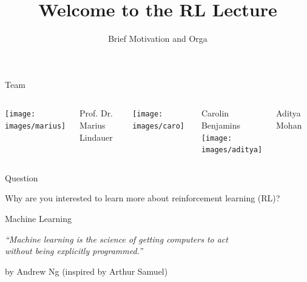 \documentclass[aspectratio=169, handout]{../latex_main/tntbeamer}  %
\title[ML-RL: Big Picture]{Welcome to the RL Lecture}
\subtitle{Brief Motivation and Orga}
\begin{document}
	
	\maketitle

\begin{frame}[c]{Team}
	
	\begin{columns}[T]
		
		\centering
		\texttt{[image: images/marius]}
		
		Prof. Dr.\\ Marius Lindauer
		
		\centering
		\texttt{[image: images/caro]}
		
		Carolin Benjamins\\
		
		\centering
		\texttt{[image: images/aditya]}
		
		Aditya Mohan \\
		
		
		
		
	\end{columns}
	
	
\end{frame}
\begin{frame}[c]{Question}
	
	\centering
	{
	\huge
	Why are you interested to learn more about reinforcement learning (RL)?
	}

	
\end{frame}
\begin{frame}[c]{Machine Learning}

\centering
\textit{``Machine learning is the science of getting computers to act\\
 without being explicitly programmed.''}

\hfill by Andrew Ng (inspired by Arthur Samuel)

\end{frame}
\end{document}
